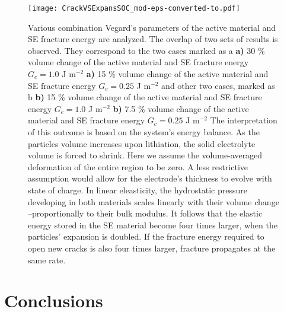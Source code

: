 \documentclass[final,5p,sort&compress]{elsarticle}
\begin{document}
\begin{figure}
\texttt{[image: CrackVSExpansSOC\_mod-eps-converted-to.pdf]} 
\captionsetup{singlelinecheck=off}
\caption{Various combination Vegard's parameters of the active material and SE fracture energy are analyzed. The overlap of two sets of results is observed.  
They correspond to the two cases marked as a
\newline 
\textbf{a)} 30 \% volume change of the active material and SE fracture energy $G_c = 1.0$ J m$^{-2}$ 
\newline 
\textbf{a)} 15 \% volume change of the active material and SE fracture energy $G_c = 0.25$ J m$^{-2}$ 
\newline
and other two cases, marked as b 
\newline
\textbf{b)} 15 \% volume change of the active material and SE fracture energy $G_c = 1.0$ J m$^{-2}$ 
\newline
\textbf{b)} 7.5 \% volume change of the active material and SE fracture energy $G_c = 0.25$ J m$^{-2}$ 
\newline
The interpretation of this outcome is based on the system's energy balance.   
As the particles volume increases upon lithiation, the solid electrolyte volume is forced to shrink.
Here we assume the volume-averaged deformation of the entire region to be zero. A less restrictive assumption would allow for the electrode's thickness to evolve with state of charge.
%
In linear eleasticity, the hydrostatic pressure developing in both materials scales linearly with their volume change --proportionally to their bulk modulus.
It follows that the elastic energy stored in the SE material become four times larger, when the particles' expansion is doubled. If the fracture energy required to open new cracks is also four times larger,
fracture propagates at the same rate.
}
\label{fig:crackL_vsExpansion}
\end{figure}





\section{Conclusions}
\label{Conclusions}
\end{document}
